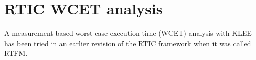 \section{RTIC WCET analysis}
A measurement-based worst-case execution time (WCET) analysis with KLEE has
been tried in an earlier revision of the RTIC framework\cite{lindner} when it was
called RTFM.  
